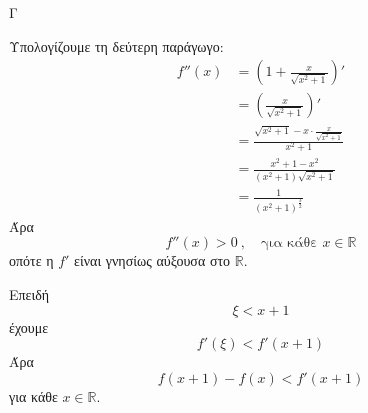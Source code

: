 \begin{thema}{Γ}
\begin{erwthma}
Υπολογίζουμε τη δεύτερη παράγωγο:
\begin{align*}
f''(x)
&=\left(1+\frac{x}{\sqrt{x^2+1}}\right)'\\
&=\left(\frac{x}{\sqrt{x^2+1}}\right)'\\
&=\frac{\sqrt{x^2+1}-x\cdot\frac{x}{\sqrt{x^2+1}}}{x^2+1}\\
&=\frac{x^2+1-x^2}{(x^2+1)\sqrt{x^2+1}}\\
&=\frac{1}{(x^2+1)^{\frac{3}{2}}}
\end{align*}
Άρα
\[
f''(x)>0\ ,\quad \text{για κάθε }x\in\mathbb{R}
\]
οπότε η $f'$ είναι γνησίως αύξουσα στο $\mathbb{R}$.

Επειδή
\[
\xi<x+1
\]
έχουμε
\[
f'(\xi)<f'(x+1)
\]
Άρα
\[
f(x+1)-f(x)<f'(x+1)
\]
για κάθε $x\in\mathbb{R}$.
\end{erwthma}
\end{thema}


